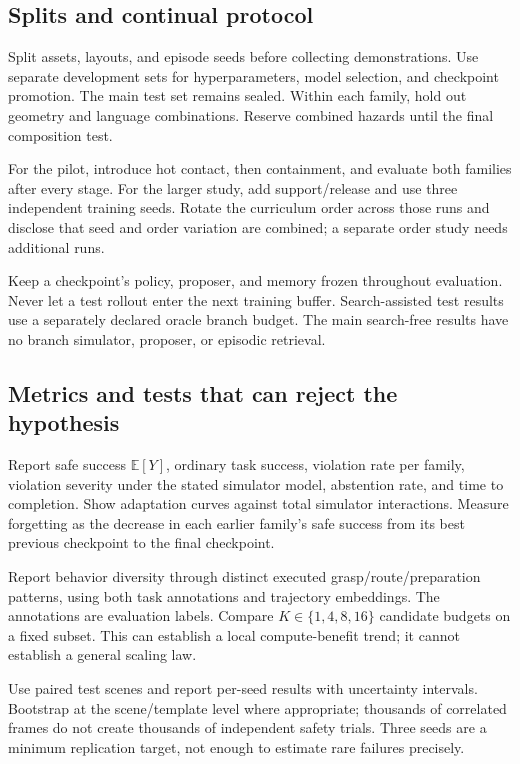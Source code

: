 \documentclass[11pt]{article}
\newcommand{\E}{\mathbb{E}}
\begin{document}
\subsection{Splits and continual protocol}

Split assets, layouts, and episode seeds before collecting demonstrations. Use separate development sets for hyperparameters, model selection, and checkpoint promotion. The main test set remains sealed. Within each family, hold out geometry and language combinations. Reserve combined hazards until the final composition test.

For the pilot, introduce hot contact, then containment, and evaluate both families after every stage. For the larger study, add support/release and use three independent training seeds. Rotate the curriculum order across those runs and disclose that seed and order variation are combined; a separate order study needs additional runs.

Keep a checkpoint's policy, proposer, and memory frozen throughout evaluation. Never let a test rollout enter the next training buffer. Search-assisted test results use a separately declared oracle branch budget. The main search-free results have no branch simulator, proposer, or episodic retrieval.

\subsection{Metrics and tests that can reject the hypothesis}

Report safe success $\E[Y]$, ordinary task success, violation rate per family, violation severity under the stated simulator model, abstention rate, and time to completion. Show adaptation curves against total simulator interactions. Measure forgetting as the decrease in each earlier family's safe success from its best previous checkpoint to the final checkpoint.

Report behavior diversity through distinct executed grasp/route/preparation patterns, using both task annotations and trajectory embeddings. The annotations are evaluation labels. Compare $K\in\{1,4,8,16\}$ candidate budgets on a fixed subset. This can establish a local compute-benefit trend; it cannot establish a general scaling law.

Use paired test scenes and report per-seed results with uncertainty intervals. Bootstrap at the scene/template level where appropriate; thousands of correlated frames do not create thousands of independent safety trials. Three seeds are a minimum replication target, not enough to estimate rare failures precisely.
\end{document}
